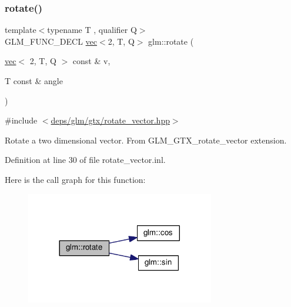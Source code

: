 \subsubsection{\texorpdfstring{rotate()}{rotate()}\hspace{0.1cm}{\footnotesize\ttfamily [1/3]}}
{\footnotesize\ttfamily template$<$typename T , qualifier Q$>$ \\
G\+L\+M\+\_\+\+F\+U\+N\+C\+\_\+\+D\+E\+CL \hyperlink{structglm_1_1vec}{vec}$<$2, T, Q$>$ glm\+::rotate (\begin{DoxyParamCaption}\item[{\hyperlink{structglm_1_1vec}{vec}$<$ 2, T, Q $>$ const \&}]{v,  }\item[{T const \&}]{angle }\end{DoxyParamCaption})}



{\ttfamily \#include $<$\hyperlink{rotate__vector_8hpp}{deps/glm/gtx/rotate\+\_\+vector.\+hpp}$>$}

Rotate a two dimensional vector. From G\+L\+M\+\_\+\+G\+T\+X\+\_\+rotate\+\_\+vector extension. 

Definition at line 30 of file rotate\+\_\+vector.\+inl.

Here is the call graph for this function\+:
\nopagebreak
\begin{figure}[H]
\begin{center}
\leavevmode
\includegraphics[width=233pt]{df/d02/group__gtx__rotate__vector_gab64a67b52ff4f86c3ba16595a5a25af6_cgraph}
\end{center}
\end{figure}
\mbox{\label{group__gtx__rotate__vector_ga1ba501ef83d1a009a17ac774cc560f21}} 
